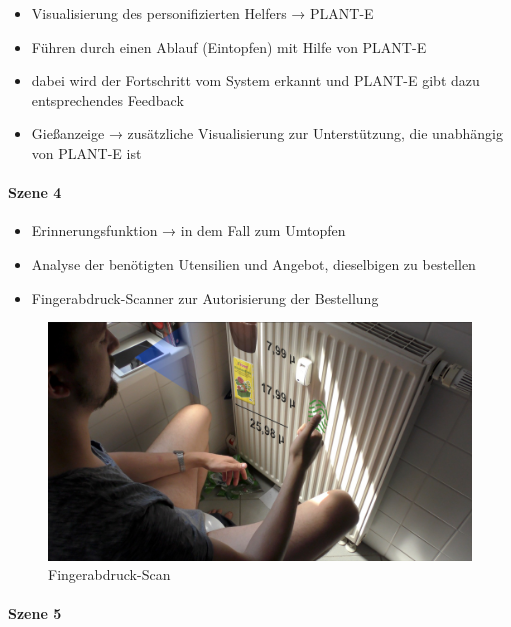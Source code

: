 \begin{itemize}
\tightlist
\item
  Visualisierung des personifizierten Helfers → PLANT-E
\item
  Führen durch einen Ablauf (Eintopfen) mit Hilfe von PLANT-E
\item
  dabei wird der Fortschritt vom System erkannt und PLANT-E gibt dazu
  entsprechendes Feedback
\item
  Gießanzeige → zusätzliche Visualisierung zur Unterstützung, die
  unabhängig von PLANT-E ist
\end{itemize}

\hypertarget{szene-4}{%
\paragraph{Szene 4}\label{szene-4}}

\begin{itemize}
\tightlist
\item
  Erinnerungsfunktion → in dem Fall zum Umtopfen
\item
  Analyse der benötigten Utensilien und Angebot, dieselbigen zu
  bestellen
\item
  Fingerabdruck-Scanner zur Autorisierung der Bestellung
\end{itemize}

\begin{figure}
\centering
\includegraphics{img/UI/Badansicht.jpg}
\caption{Fingerabdruck-Scan}
\end{figure}

\hypertarget{szene-5}{%
\paragraph{Szene 5}\label{szene-5}}

